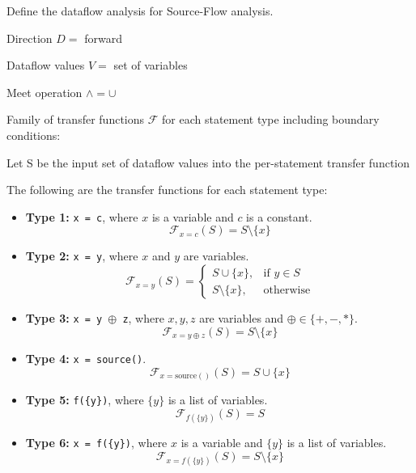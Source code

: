 \documentclass[12pt]{article}
\begin{document}
\begin{enumerate}
      Define the dataflow analysis for Source-Flow analysis.

      \begin{mdframed}
        Direction $D = $ forward

        Dataflow values $V = $ set of variables

        Meet operation $\wedge = \cup $

        Family of transfer functions $\mathcal{F}$ for each statement type
        including boundary conditions:

        Let S be the input set of dataflow values into the per-statement transfer function

        The following are the transfer functions for each statement type:

\begin{itemize}

    \item \textbf{Type 1:} \texttt{x = c}, where $x$ is a variable and $c$ is a constant.
    \[
        \mathcal{F}_{x = c}(S) = S \setminus \{x\}
    \]

    \item \textbf{Type 2:} \texttt{x = y}, where $x$ and $y$ are variables.
    \[
        \mathcal{F}_{x = y}(S) =
        \begin{cases}
            S \cup \{x\}, & \text{if } y \in S \\
            S \setminus \{x\}, & \text{otherwise}
        \end{cases}
    \]

    \item \textbf{Type 3:} \texttt{x = y $\oplus$ z}, where $x, y, z$ are variables and $\oplus \in \{+, -, *\}$.
    \[
        \mathcal{F}_{x = y \oplus z}(S) = S \setminus \{x\}
    \]

    \item \textbf{Type 4:} \texttt{x = source()}.
    \[
        \mathcal{F}_{x = \text{source}()}(S) = S \cup \{x\}
    \]

    \item \textbf{Type 5:} \texttt{f(\{y\})}, where $\{y\}$ is a list of variables.
    \[
        \mathcal{F}_{f(\{y\})}(S) = S
    \]

    \item \textbf{Type 6:} \texttt{x = f(\{y\})}, where $x$ is a variable and $\{y\}$ is a list of variables.
    \[
        \mathcal{F}_{x = f(\{y\})}(S) = S \setminus \{x\}
    \]

\end{itemize}


\end{mdframed}
\end{enumerate}
\end{document}
